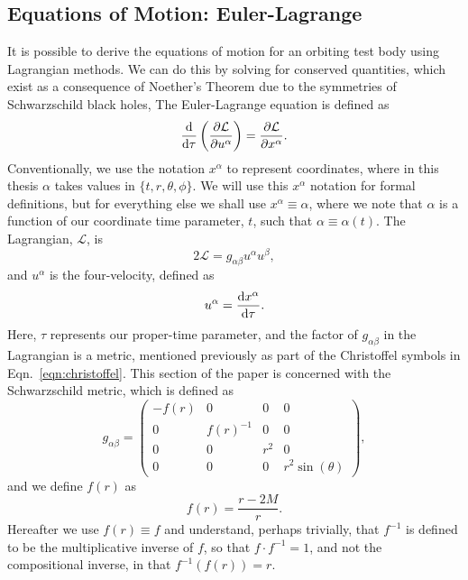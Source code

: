 \subsection{Equations of Motion: Euler-Lagrange}
It is possible to derive the equations of motion for an orbiting test body using Lagrangian methods.
We can do this by solving for conserved quantities, which exist as a consequence of Noether's Theorem due to the symmetries of Schwarzschild black holes, 
The Euler-Lagrange equation is defined as \cite{eulerLagrange}
\begin{equation}
\dv{\tau} \left(\frac{\partial \mathcal{L}}{\partial u^\alpha} \right)=\frac{\partial \mathcal{L}}{\partial x^\alpha}.
\end{equation}
Conventionally, we use the notation $x^\alpha$ to represent coordinates, where in this thesis $\alpha$ takes values in $\{t,r,\theta,\phi\}$.
We will use this $x^\alpha$ notation for formal definitions, but for everything else we shall use $x^\alpha\equiv\alpha$, where we note that $\alpha$ is a function of our coordinate time parameter, $t$, such that $\alpha\equiv\alpha(t)$.
The Lagrangian, $\mathcal{L}$, is \cite{chandraBook}
\begin{equation}\label{eqn:stdlagrangian}
2\mathcal{L}=g_{\alpha\beta}u^\alpha u^\beta,
\end{equation}
and $u^\alpha$ is the four-velocity, defined as
\begin{equation}
u^\alpha = \dv{x^\alpha}{\tau}.
\end{equation}
Here, $\tau$ represents our proper-time parameter, and the factor of $g_{\alpha\beta}$ in the Lagrangian is a metric, mentioned previously as part of the Christoffel symbols in Eqn.~\eqref{eqn:christoffel}.
This section of the paper is concerned with the Schwarzschild metric, which is defined as \cite{schwarz1916}
\begin{equation}\label{eqn:schwarzMet}
g_{\alpha\beta}=
\begin{pmatrix}
    -f(r) & 0 & 0 & 0\\
    0 & f(r)^{-1} & 0 & 0\\
    0 & 0 & r^2 & 0\\
    0 & 0 & 0 & r^2\sin(\theta)
\end{pmatrix},
\end{equation}
and we define $f(r)$ as
\begin{equation}
f(r)=\frac{r-2M}{r}.
\end{equation}
Hereafter we use $f(r)\equiv f$ and understand, perhaps trivially, that $f^{-1}$ is defined to be the multiplicative inverse of $f$, so that $f\cdot f^{-1}=1$, and not the compositional inverse, in that $f^{-1}(f(r))=r$.
